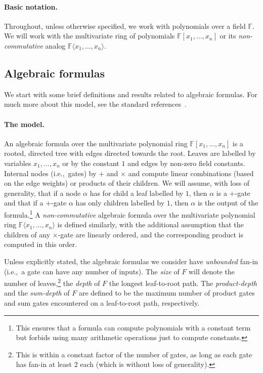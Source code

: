 \documentclass[10pt,a4paper]{article}
\newcommand{\F}{\mathbb{F}}
\newcommand{\comment}[2]{\marginpar{\tiny{\textbf{#1: }\textit{#2}}}}
\newcommand{\gm}[1]{\comment{GM}{#1}}
\begin{document}
\paragraph{Basic notation.} Throughout, unless otherwise specified, we work with polynomials over a field $\F$. We will work with the multivariate ring of polynomials $\F[x_1,\ldots,x_n]$ or its \emph{non-commutative} analog $\F\langle  x_1,\ldots,x_n \rangle.$ 

\subsection{Algebraic formulas} 
\label{sec:formula-prelims}

We start with some brief definitions and results related to algebraic formulas. For much more about this model, see the standard references~\cite{SY,Ramprasadsurvey}.

\paragraph{The model.} An algebraic formula over the multivariate polynomial ring $\F[x_1,\ldots,x_n]$ is a rooted, directed tree with edges directed towards the root. Leaves are labelled by variables $x_1,\ldots,x_n$ or by the constant \(1\) and edges by non-zero field constants. Internal nodes (i.e.,~gates) by $+$ and $\times$ and compute linear combinations (based on the edge weights) or products of their children. We will assume, with loss of generality, that if a node \(\alpha\) has for child a leaf labelled by \(1\), then \(\alpha\)  is a \(+\)-gate and that if a \(+\)-gate \(\alpha\) has only children labelled by \(1\), then \(\alpha\) is the output of the formula.\footnote{This ensures that a formula can compute polynomials with a constant term but forbids using many arithmetic operations just to compute constants.}
A \emph{non-commutative} algebraic formula  over the multivariate polynomial ring $\F\langle x_1,\ldots,x_n\rangle$ is defined similarly, with the additional assumption that the children of any $\times$-gate are linearly ordered, and the corresponding product is computed in this order.

Unless explicitly stated, the algebraic formulas we consider have \emph{unbounded} fan-in (i.e.,~a gate can have any number of inputs). The \emph{size} of $F$ will denote the number of leaves,\footnote{\label{ft:fanin}This is within a constant factor of the number of gates, as long as each gate has fan-in at least $2$ each (which is without loss of generality).} the \emph{depth} of $F$ the longest leaf-to-root path. The \emph{product-depth} and the \emph{sum-depth} of $F$ are defined to be the maximum number of product gates and sum gates encountered on a leaf-to-root path, respectively.
\end{document}
